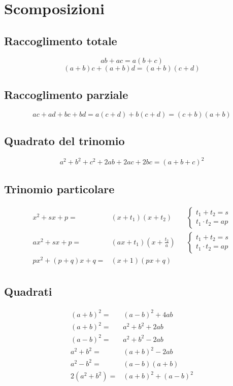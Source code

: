 \chapter{Scomposizioni}
\section{Raccoglimento totale}
\begin{equation*}
ab+ac=a(b+c)
\end{equation*}
\begin{equation*}
(a+b)c+(a+b)d=(a+b)(c+d)
\end{equation*}
\section{Raccoglimento parziale}
\begin{equation*}
ac+ad+bc+bd=a(c+d)+b(c+d)=(c+b)(a+b)
\end{equation*}
\section{Quadrato del trinomio}
\begin{equation*}
a^2+b^2+c^2+2ab+2ac+2bc=(a+b+c)^2
\end{equation*}
\section{Trinomio particolare}
\begin{align*}
x^2+sx+p={}&(x+t_1)(x+t_2)&&\begin{cases}
t_1+t_2=s\\
t_1\cdot t_2=ap
\end{cases}\\
ax^2+sx+p={}&(ax+t_1)(x+\frac{t_2}{a})&&\begin{cases}
t_1+t_2=s\\
t_1\cdot t_2=ap
\end{cases}\\
px^2+(p+q)x+q={}&(x+1)(px+q)\\
\end{align*}
\section{Quadrati}
\begin{align*}
(a+b)^2={}&(a-b)^2+4ab\\
(a+b)^2={}&a^2+b^2+2ab\\
(a-b)^2={}&a^2+b^2-2ab\\
a^2+b^2={}&(a+b)^2-2ab\\
a^2-b^2={}&(a-b)(a+b)\\
2(a^2+b^2)={}&(a+b)^2+(a-b)^2\\
\end{align*}
